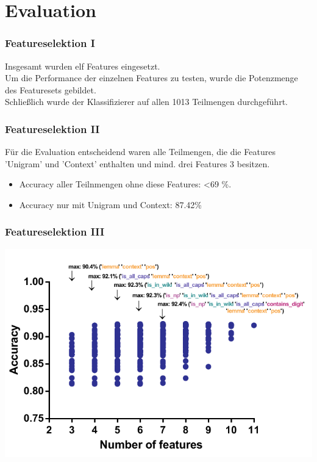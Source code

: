 \documentclass{beamer}
\begin{document}
\section{Evaluation}
	\begin{frame}
		\frametitle{Featureselektion I}
		Insgesamt wurden elf Features eingesetzt.\\
		
		Um die Performance der einzelnen Features zu testen, wurde die Potenzmenge des Featuresets gebildet.\\
		
		Schließlich wurde der Klassifizierer auf allen 1013 Teilmengen durchgeführt.\\
	\end{frame}
	\begin{frame}
		\frametitle{Featureselektion II}
			Für die Evaluation entscheidend waren alle Teilmengen, die die Features 'Unigram' und 'Context' enthalten und mind. drei Features 3 besitzen.\\
					
			\begin{itemize}
				\item Accuracy aller Teilnmengen ohne diese Features: \textless 69 \%.
				\item Accuracy nur mit Unigram und Context: 87.42\%
			\end{itemize}

					
	\end{frame}
		\begin{frame}
			\frametitle{Featureselektion III}
			\includegraphics[scale=0.9]{accuracy.pdf}\\

		\end{frame}
\end{document}
